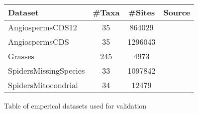 \begin{tabular} { l c c c}
   Dataset & \#Taxa & \#Sites & Source \\
   \hline
   AngiospermsCDS12 & 35 & 864029 & \cite{ran_phylogenomics_2018}\\
   AngiospermsCDS & 35 & 1296043 & \cite{ran_phylogenomics_2018}\\
   Grasses & 245 & 4973 & \cite{christin_molecular_2014}\\
   SpidersMissingSpecies & 33 & 1097842 & \cite{leduc-robert_phylogeny_2018}\\
   SpidersMitocondrial & 34 & 12479 & \cite {leduc-robert_phylogeny_2018}\\
\end{tabular}
\caption{Table of emperical datasets used for validation}
